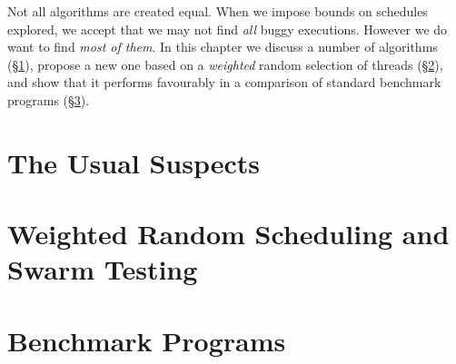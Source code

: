 \chapstart Not all algorithms are created equal.
When we impose bounds on schedules explored, we accept that we may not find \emph{all} buggy
executions.  However we do want to find \emph{most of them}.  In this chapter we discuss a number of
algorithms (\S\ref{sec:algorithms-usual}), propose a new one based on a \emph{weighted} random
selection of threads (\S\ref{sec:algorithms-swarm}), and show that it performs favourably in a
comparison of standard benchmark programs (\S\ref{sec:algorithms-sctbench}).

\section{The Usual Suspects}
\label{sec:algorithms-usual}

\blindtext

\section{Weighted Random Scheduling and Swarm Testing}
\label{sec:algorithms-swarm}

\blindtext

\section{Benchmark Programs}
\label{sec:algorithms-sctbench}

\blindtext
